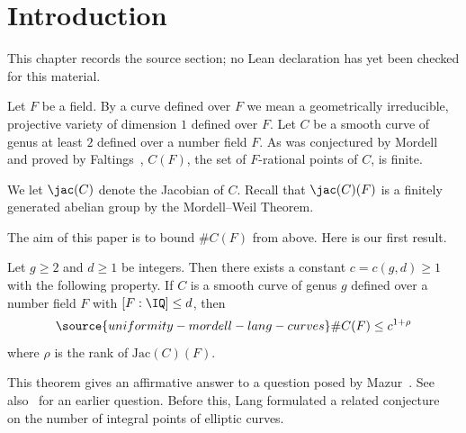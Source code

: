 \chapter{Introduction}
\label{uniformity-mordell-lang-curves-chapter-01}

\begin{remark}
\label{uniformity-mordell-lang-curves-chapter-01-source}
This chapter records the source section; no Lean declaration has yet been checked for this material.
\notready
\end{remark}

Let $F$ be a field. By a curve defined over $F$ we mean a geometrically
irreducible, projective variety of dimension $1$ defined over $F$. Let $C$ be
a smooth curve of genus at least $2$ defined over a number field $F$. As was
conjectured by Mordell and proved by Faltings~\cite{Faltings:ES},
$C(F)$, the set of $F$-rational points of $C$, is finite.

We let $\jac(C)$ denote the Jacobian of $C$. Recall
that $\jac(C)(F)$ is a finitely generated abelian group by the
Mordell--Weil Theorem.

The aim of this paper is to bound $\# C(F)$ from above. Here is our
first result.

\begin{theorem}
\notready\label{ThmBdRatIntro}
  Let $g \ge 2$ and $d \ge 1$ be integers. Then there exists a constant
  $c = c(g, d) \ge 1$ with the following property. If $C$ is a smooth curve
  of genus $g$  defined
  over a number field $F$  with $[F:\IQ] \le d$, then
  \begin{equation}
    \label{eq:CKexpinrank}
\source{uniformity-mordell-lang-curves}
      \#C(F) \le c^{1+\rho}
  \end{equation}
  where $\rho$ is the rank of  $\mathrm{Jac}(C)(F)$.%
\end{theorem}

This theorem gives an affirmative answer to a question posed by
Mazur~\cite[Page~223]{Mazur:00}.
See also~\cite[top of
page 234]{mazur1986arithmetic} for an earlier question. Before this,
 Lang formulated a related  conjecture~\cite[page
 140]{Lang:EllipticCurves78} on the number of integral
points of elliptic curves.

